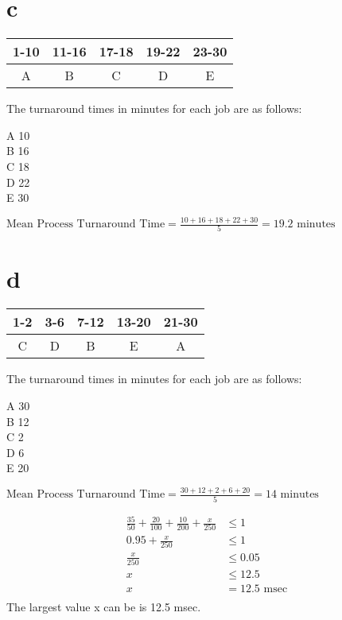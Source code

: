 	\part{c}
		\begin{tabular}{|c|c|c|c|c|}
			\hline
			1-10 & 11-16 & 17-18 & 19-22 & 23-30\\
			\hline
			A & B & C & D & E\\
			\hline
		\end{tabular}\par
		The turnaround times in minutes for each job are as follows:\par
		A 10\\
		B 16\\
		C 18\\
		D 22\\
		E 30\par
		$\text{Mean Process Turnaround Time} = \frac{10 + 16 + 18 + 22 + 30}{5} = 19.2 \text{ minutes}$

	\part{d}
		\begin{tabular}{|c|c|c|c|c|}
			\hline
			1-2 & 3-6 & 7-12 & 13-20 & 21-30\\
			\hline
			C & D & B & E & A\\
			\hline
		\end{tabular}\par
		The turnaround times in minutes for each job are as follows:\par
		A 30\\
		B 12\\
		C 2\\
		D 6\\
		E 20\par
		$\text{Mean Process Turnaround Time} = \frac{30 + 12 + 2 + 6 + 20}{5} = 14 \text{ minutes}$


\newpage
{}	
	\begin{align*}
		\frac{35}{50} + \frac{20}{100} + \frac{10}{200} + \frac{x}{250} &\le 1\\
		0.95 + \frac{x}{250} &\le 1\\
		\frac{x}{250} &\le 0.05\\
		x &\le 12.5\\
		x &= 12.5 \text{ msec}\\
	\end{align*}
	The largest value x can be is 12.5 msec. 


